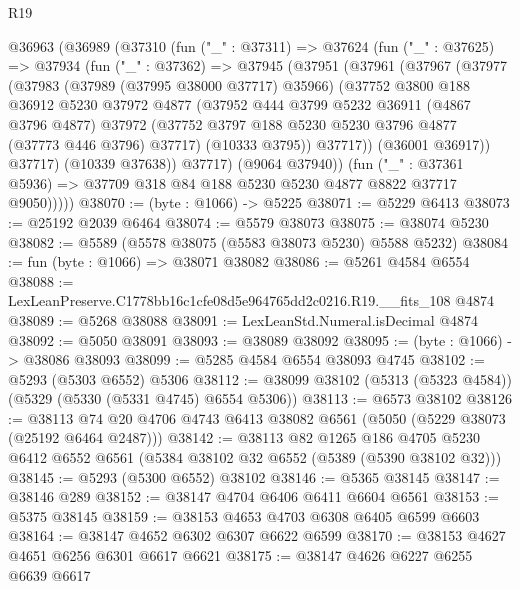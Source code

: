 \begin{lexlean}{R19}
\begin{coremodule}
  @36963
    (@36989
      (@37310
        (fun ("_" : @37311) =>
        @37624
          (fun ("_" : @37625) =>
          @37934
            (fun ("_" : @37362) =>
            @37945
              (@37951
                (@37961
                  (@37967
                    (@37977
                      (@37983
                        (@37989 (@37995 @38000 @37717) @35966)
                        (@37752
                          @3800
                          @188
                          @36912
                          @5230
                          @37972
                          @4877
                          (@37952
                            @444
                            @3799
                            @5232
                            @36911
                            (@4867 @3796 @4877)
                            @37972
                            (@37752 @3797 @188 @5230 @5230 @3796 @4877 (@37773 @446 @3796) @37717)
                            (@10333 @3795))
                          @37717))
                      (@36001 @36917))
                    @37717)
                  (@10339 @37638))
                @37717)
              (@9064 @37940))
            (fun ("_" : @37361 @5936) =>
            @37709 @318 @84 @188 @5230 @5230 @4877 @8822 @37717 @9050)))))
@38070 := (byte : @1066) -> @5225
@38071 := @5229 @6413
@38073 := @25192 @2039 @6464
@38074 := @5579 @38073
@38075 := @38074 @5230
@38082 := @5589 (@5578 @38075 (@5583 @38073 @5230) @5588 @5232)
@38084 := fun (byte : @1066) => @38071 @38082
@38086 := @5261 @4584 @6554
@38088 := LexLeanPreserve.C1778bb16c1cfe08d5e964765dd2c0216.R19.__fits_108 @4874
@38089 := @5268 @38088
@38091 := LexLeanStd.Numeral.isDecimal @4874
@38092 := @5050 @38091
@38093 := @38089 @38092
@38095 := (byte : @1066) -> @38086 @38093
@38099 := @5285 @4584 @6554 @38093 @4745
@38102 := @5293 (@5303 @6552) @5306
@38112 := @38099 @38102 (@5313 (@5323 @4584)) (@5329 (@5330 (@5331 @4745) @6554 @5306))
@38113 := @6573 @38102
@38126 := @38113 @74 @20 @4706 @4743 @6413 @38082 @6561 (@5050 (@5229 @38073 (@25192 @6464 @2487)))
@38142 := @38113
    @82
    @1265
    @186
    @4705
    @5230
    @6412
    @6552
    @6561
    (@5384 @38102 @32 @6552 (@5389 (@5390 @38102 @32)))
@38145 := @5293 (@5300 @6552) @38102
@38146 := @5365 @38145
@38147 := @38146 @289
@38152 := @38147 @4704 @6406 @6411 @6604 @6561
@38153 := @5375 @38145
@38159 := @38153 @4653 @4703 @6308 @6405 @6599 @6603
@38164 := @38147 @4652 @6302 @6307 @6622 @6599
@38170 := @38153 @4627 @4651 @6256 @6301 @6617 @6621
@38175 := @38147 @4626 @6227 @6255 @6639 @6617

\end{coremodule}
\end{lexlean}
